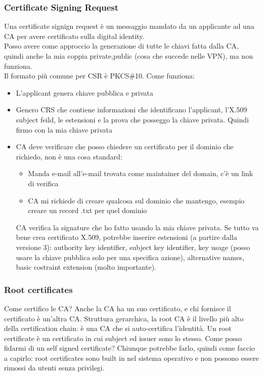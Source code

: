 \documentclass[16px]{article}
\begin{document}
\subsubsection{Certificate Signing Request}
Una certificate signign request è un messaggio mandato da un applicante ad una CA per avere certificato sulla digital identity.\\ Posso avere come approccio la generazione di tutte le chiavi fatta dalla CA, quindi anche la mia coppia private,public (cosa che succede nelle VPN), ma non funziona.\\ Il formato più comune per CSR è PKCS\#10. Come funziona:
\begin{itemize}
\item L'applicant genera chiave pubblica e privata
\item Genero CRS che contiene informazioni che identificano l'applicant, l'X.509 subject feild, le  estensioni e la prova che posseggo la chiave privata. Quindi firmo con la mia chiave privata
\item CA deve verificare che posso chiedere un certificato per il dominio che richiedo, non è una cosa standard:
\begin{itemize}
\item Manda e-mail all'e-mail trovata come maintainer del domain, c'è un link di verifica
\item CA mi richiede di creare qualcosa sul dominio che mantengo, esempio creare un record .txt per quel dominio
\end{itemize}
CA verifica la signature che ho fatto usando la mia chiave privata. Se tutto va bene crea certificato X.509, potrebbe inserire estensioni (a partire dalla versione 3): authority key identifier, subject key identifier, key usage (posso usare la chiave pubblica solo per una specifica azione), alternative names, basic costraint extension (molto importante).
\end{itemize}
\subsubsection{Root certificates}
Come certifico le CA? Anche la CA ha un suo certificato, e chi fornisce il certificato è un'altra CA. Struttura gerarchica, la root CA è il livello più alto della certification chain: è una CA che si auto-certifica l'identità. Un root certificate è un certificato in cui subject ed issuer sono lo stesso. Come posso fidarmi di un self signed  certificate? Chiunque potrebbe farlo, quindi come faccio a capirlo: root certificates sono built in nel sistema operativo e non possono essere rimossi da utenti senza privilegi.
\end{document}
